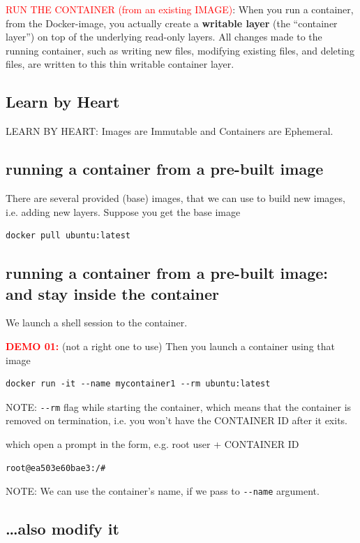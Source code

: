 \textcolor{red}{RUN THE CONTAINER (from an existing IMAGE)}:
When you run a container, from the Docker-image, you actually create a {\bf
writable layer} (the “container layer”) on top of the underlying read-only
layers. All changes made to the running container, such as writing new files,
modifying existing files, and deleting files, are written to this thin writable
container layer.


\subsection{Learn by Heart}


LEARN BY HEART: Images are Immutable and Containers are Ephemeral.


\subsection{running a container from a pre-built image}


There are several provided (base) images, that we can use to build new images, i.e. adding new layers.
Suppose you get the base image
\begin{verbatim}
docker pull ubuntu:latest
\end{verbatim}


\subsection{running a container from a pre-built image: and stay inside the container}

We launch a shell session to the container.

\textcolor{red}{\bf DEMO 01:} (not a right one to use)
Then you launch a container using that image
\begin{verbatim}
docker run -it --name mycontainer1 --rm ubuntu:latest
\end{verbatim}
NOTE: \verb!--rm! flag while starting the container, which means that the container is removed on termination, i.e. 
you won't have the CONTAINER ID after it exits.

which open a prompt in the form, e.g. root user + CONTAINER ID
\begin{verbatim}
root@ea503e60bae3:/#
\end{verbatim}
NOTE: We can use the container's name, if we pass to \verb!--name! argument.

\subsection{\ldots also modify it}


